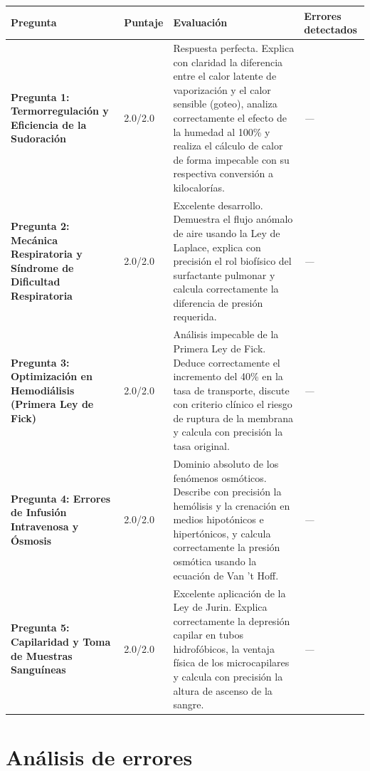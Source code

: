 \documentclass[11pt,a4paper]{article}
\begin{document}
\begin{longtable}{>{\bfseries}p{2.8cm} p{1.6cm} p{7.0cm} p{2.8cm}}
  \toprule
  \textbf{Pregunta} & \textbf{Puntaje} & \textbf{Evaluación} & \textbf{Errores detectados} \\
  \midrule
  \endhead
  \bottomrule
  \endfoot
    \textbf{Pregunta 1: Termorregulación y Eficiencia de la Sudoración} & 2.0/2.0 & Respuesta perfecta. Explica con claridad la diferencia entre el calor latente de vaporización y el calor sensible (goteo), analiza correctamente el efecto de la humedad al 100\% y realiza el cálculo de calor de forma impecable con su respectiva conversión a kilocalorías. & \textit{---} \\
    \midrule
    \textbf{Pregunta 2: Mecánica Respiratoria y Síndrome de Dificultad Respiratoria} & 2.0/2.0 & Excelente desarrollo. Demuestra el flujo anómalo de aire usando la Ley de Laplace, explica con precisión el rol biofísico del surfactante pulmonar y calcula correctamente la diferencia de presión requerida. & \textit{---} \\
    \midrule
    \textbf{Pregunta 3: Optimización en Hemodiálisis (Primera Ley de Fick)} & 2.0/2.0 & Análisis impecable de la Primera Ley de Fick. Deduce correctamente el incremento del 40\% en la tasa de transporte, discute con criterio clínico el riesgo de ruptura de la membrana y calcula con precisión la tasa original. & \textit{---} \\
    \midrule
    \textbf{Pregunta 4: Errores de Infusión Intravenosa y Ósmosis} & 2.0/2.0 & Dominio absoluto de los fenómenos osmóticos. Describe con precisión la hemólisis y la crenación en medios hipotónicos e hipertónicos, y calcula correctamente la presión osmótica usando la ecuación de Van 't Hoff. & \textit{---} \\
    \midrule
    \textbf{Pregunta 5: Capilaridad y Toma de Muestras Sanguíneas} & 2.0/2.0 & Excelente aplicación de la Ley de Jurin. Explica correctamente la depresión capilar en tubos hidrofóbicos, la ventaja física de los microcapilares y calcula con precisión la altura de ascenso de la sangre. & \textit{---} \\
    \midrule
\end{longtable}

\section*{Análisis de errores}
\end{document}
